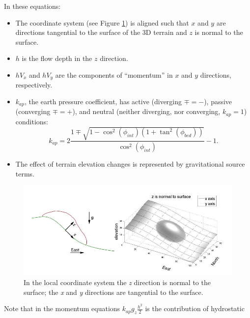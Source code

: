 \documentclass[review]{elsarticle}
\begin{document}
In these equations:
\begin{itemize}
        \item The coordinate system (see Figure \ref{xzeast}) is aligned such that $x$ and $y$ are directions tangential  
              to the surface of the 3D terrain and $z$ is normal to the surface.
        
        \item $h$ is the flow depth in the $z$ direction.
        \item $hV_x$ and $hV_y$ are the components of ``momentum'' in $x$ and $y$ directions, respectively.
        \item{ $k_{ap}$, %
         the earth pressure coefficient,  has active 
              (diverging $\mp=-$), passive (converging $\mp=+$), and neutral (neither diverging, nor converging, $k_{ap}=1$) conditions:
              \begin{equation}
                        k_{ap}=2\frac{1\mp\sqrt{1-\cos^2(\phi_{int})\left(1+\tan^2(\phi_{bed})\right)}}{\cos^2(\phi_{int})}-1.
                \end{equation}
             }
             \item The effect of terrain elevation changes is represented by gravitational source terms. 
\end{itemize}
\begin{figure}[!t]
        \begin{center}
                 \includegraphics[width=1\textwidth]{IMAGES/1.jpg}
                \caption{In the local coordinate system the {\itshape z} direction is normal to the surface; 
                the {\itshape x} and {\itshape y} directions are tangential to the surface.}
                \label{xzeast}
        \end{center}
\end{figure}
Note that in the momentum equations $k_{ap}g_z\frac{h^2}{2}$ is the contribution of hydrostatic 
\end{document}
